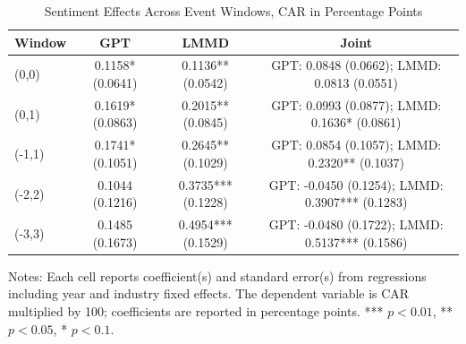 \begin{table}[htbp]
\centering
\caption{Sentiment Effects Across Event Windows, CAR in Percentage Points}
\label{tab:car_sentiment_windows}
\begin{tabular}{lccc}
\toprule
Window & GPT & LMMD & Joint \\
\midrule
(0,0) & 0.1158* (0.0641) & 0.1136** (0.0542) & GPT: 0.0848 (0.0662); LMMD: 0.0813 (0.0551) \\
(0,1) & 0.1619* (0.0863) & 0.2015** (0.0845) & GPT: 0.0993 (0.0877); LMMD: 0.1636* (0.0861) \\
(-1,1) & 0.1741* (0.1051) & 0.2645** (0.1029) & GPT: 0.0854 (0.1057); LMMD: 0.2320** (0.1037) \\
(-2,2) & 0.1044 (0.1216) & 0.3735*** (0.1228) & GPT: -0.0450 (0.1254); LMMD: 0.3907*** (0.1283) \\
(-3,3) & 0.1485 (0.1673) & 0.4954*** (0.1529) & GPT: -0.0480 (0.1722); LMMD: 0.5137*** (0.1586) \\
\bottomrule
\end{tabular}
\begin{flushleft}
\footnotesize Notes: Each cell reports coefficient(s) and standard error(s) from regressions including year and industry fixed effects. The dependent variable is CAR multiplied by 100; coefficients are reported in percentage points. *** $p<0.01$, ** $p<0.05$, * $p<0.1$.
\end{flushleft}
\end{table}